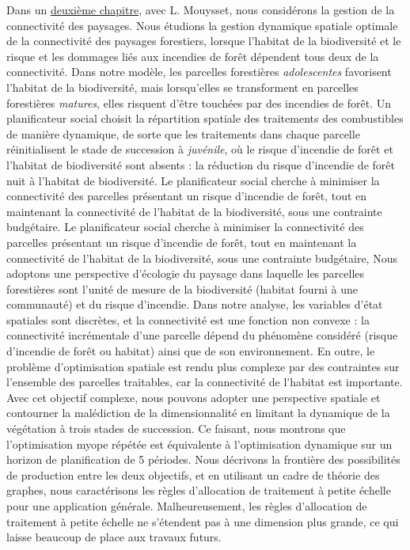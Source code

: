 \begin{displayquote}
\begin{displayquote}
\begin{displayquote}
{{{\begin{table}[H]
\end{table}


Dans un \hyperref[chapitre2]{deuxième chapitre}, avec L. Mouysset, nous considérons la gestion de la connectivité des paysages. Nous étudions la gestion dynamique spatiale optimale de la connectivité des paysages forestiers, lorsque l'habitat de la biodiversité et le risque et les dommages liés aux incendies de forêt dépendent tous deux de la connectivité. Dans notre modèle, les parcelles forestières \textit{adolescentes} favorisent l'habitat de la biodiversité, mais lorsqu'elles se transforment en parcelles forestières \textit{matures}, elles risquent d'être touchées par des incendies de forêt. Un planificateur social choisit la répartition spatiale des traitements des combustibles de manière dynamique, de sorte que les traitements dans chaque parcelle réinitialisent le stade de succession à \textit{juvénile}, où le risque d'incendie de forêt et l'habitat de biodiversité sont absents : la réduction du risque d'incendie de forêt nuit à l'habitat de biodiversité. Le planificateur social cherche à minimiser la connectivité des parcelles présentant un risque d'incendie de forêt, tout en maintenant la connectivité de l'habitat de la biodiversité, sous une contrainte budgétaire.
Le planificateur social cherche à minimiser la connectivité des parcelles présentant un risque d'incendie de forêt, tout en maintenant la connectivité de l'habitat de la biodiversité, sous une contrainte budgétaire, 
Nous adoptons une perspective d'écologie du paysage dans laquelle les parcelles forestières sont l'unité de mesure de la biodiversité (habitat fourni à une communauté) et du risque d'incendie.   Dans notre analyse, les variables d'état spatiales sont discrètes, et la connectivité est une fonction non convexe : la connectivité incrémentale d'une parcelle dépend du phénomène considéré (risque d'incendie de forêt ou habitat) ainsi que de son environnement. En outre, le problème d'optimisation spatiale est rendu plus complexe par des contraintes sur l'ensemble des parcelles traitables, car la connectivité de l'habitat est importante. Avec cet objectif complexe, nous pouvons adopter une perspective spatiale et contourner la malédiction de la dimensionnalité en limitant la dynamique de la végétation à trois stades de succession. Ce faisant, nous montrons que l'optimisation myope répétée est équivalente à l'optimisation dynamique sur un horizon de planification de 5 périodes. Nous décrivons la frontière des possibilités de production entre les deux objectifs, et en utilisant un cadre de théorie des graphes, nous caractérisons les règles d'allocation de traitement à petite échelle pour une application générale. Malheureusement, les règles d'allocation de traitement à petite échelle ne s'étendent pas à une dimension plus grande, ce qui laisse beaucoup de place aux travaux futurs.

}}}
\end{displayquote}
\end{displayquote}
\end{displayquote}

